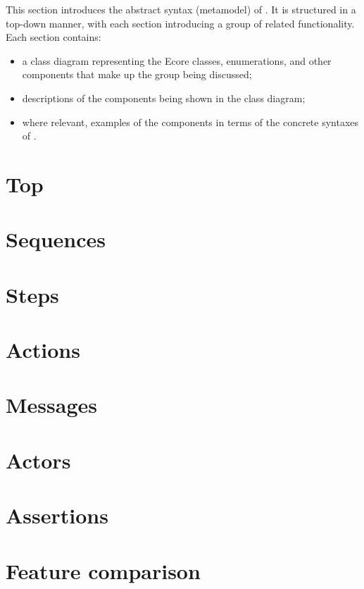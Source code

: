

This section introduces the abstract syntax (metamodel) of \langname.
It is structured in a top-down manner, with each section introducing a group of
related \langname{} functionality.  Each section contains:

\begin{itemize}
\item
	a class diagram representing the Ecore classes, enumerations, and other
	components that make up the group being discussed;
\item
	descriptions of the components being shown in the class diagram;
\item
	where relevant, examples of the components in terms of the concrete
	syntaxes of \langname.
\end{itemize}


\section{Top}\label{sec:metamodel-top}


\section{Sequences}\label{sec:metamodel-sequences}


\section{Steps}\label{sec:metamodel-steps}


\section{Actions}\label{sec:metamodel-actions}


\section{Messages}\label{sec:metamodel-messages}


\section{Actors}\label{sec:metamodel-actors}


\section{Assertions}\label{sec:metamodel-assertions}


\section{Feature comparison}\label{sec:metamodel-features}


